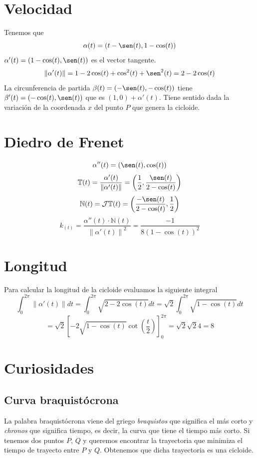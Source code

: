 \documentclass{article}
\newcommand{\bb}[1]{\mathbb{#1}}
\begin{document}
\section{Velocidad}
Tenemos que
$$
\alpha(t) = (t- \sen(t),1-\cos(t))
$$
$\alpha'(t) = (1-\cos(t),\sen(t))$ es el vector tangente.
$$
\left\| \alpha'(t) \right\| = 1-2\cos(t)+\cos^2(t)+\sen^2(t)=2-2\cos(t)
$$
La circunferencia de partida $\beta(t)=(-\sen(t),-\cos(t))$ tiene $\beta'(t)=(-\cos(t),\sen(t))$ que es $(1,0)+\alpha'(t)$.
Tiene sentido dada la variación de la coordenada $x$ del punto $P$ que genera la cicloide.
\section{Diedro de Frenet}
$$
\alpha''(t)=(\sen(t),\cos(t))
$$
$$
\bb{T}(t)=\frac{\alpha'(t)}{\left\| \alpha'(t)  \right\|} = \left( \frac{1}{2},\frac{\sen(t)}{2-\cos(t)} \right)
$$
$$
\bb{N}(t) = \mathcal{J}\bb{T}(t)= \left( \frac{-\sen(t)}{2-\cos(t)}, \frac{1}{2}\right)
$$
$$
k_(t)=\frac{\alpha''(t)\cdot\bb{N}(t)}{\left\| \alpha'(t) \right\|^2}= \frac{-1}{8 (1-\cos(t))^2}
$$
\section{Longitud}
Para calcular la longitud de la cicloide evaluamos la siguiente integral
$$
\int_0^{2\pi} \left\| \alpha'(t) \right\| dt = \int_0^{2\pi} \sqrt{2-2\cos(t)} dt =\sqrt{2} \int_0^{2\pi} \sqrt{1-\cos(t)} dt
$$
$$
= \sqrt{2}\left[ -2 \sqrt{1-\cos(t)}\cot\left(\frac{t}{2}\right)\right]_0^{2\pi} = \sqrt{2}\sqrt{2}4=8
$$
\section{Curiosidades}
\subsection{Curva braquistócrona}
La palabra braquistócrona viene del griego \textit{braquistos} que significa el más corto y \textit{chronos} que significa tiempo,
es decir, la curva que tiene el tiempo más corto. Si tenemos dos puntos $ P $, $ Q $ y queremos encontrar la trayectoria que
minimiza el tiempo de trayecto entre $ P $ y $ Q $. Obtenemos que dicha trayectoria es una cicloide.
\end{document}
